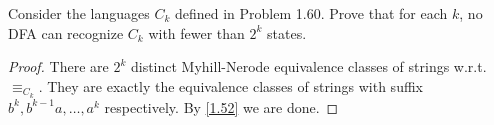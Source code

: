 \begin{exercise}
  Consider the languages $C_k$ defined in Problem 1.60. Prove that for each $k$, no DFA can recognize $C_k$ with fewer than $2^k$ states.
\end{exercise}

\begin{proof}
  There are $2^k$ distinct Myhill-Nerode equivalence classes of strings w.r.t. $\equiv_{C_k}$. They are exactly the equivalence classes of strings with suffix $b^k, b^{k-1}a,\dots,a^k$ respectively. By \ref{1.52} we are done.
\end{proof}
